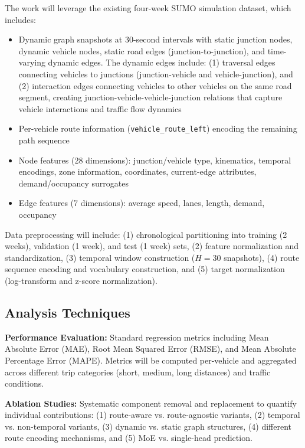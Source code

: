 The work will leverage the existing four-week SUMO simulation dataset, which includes:
\begin{itemize}
    \item Dynamic graph snapshots at 30-second intervals with static junction nodes, dynamic vehicle nodes, static road edges (junction-to-junction), and time-varying dynamic edges. The dynamic edges include: (1) traversal edges connecting vehicles to junctions (junction-vehicle and vehicle-junction), and (2) interaction edges connecting vehicles to other vehicles on the same road segment, creating junction-vehicle-vehicle-junction relations that capture vehicle interactions and traffic flow dynamics
    \item Per-vehicle route information (\texttt{vehicle\_route\_left}) encoding the remaining path sequence
    \item Node features (28 dimensions): junction/vehicle type, kinematics, temporal encodings, zone information, coordinates, current-edge attributes, demand/occupancy surrogates
    \item Edge features (7 dimensions): average speed, lanes, length, demand, occupancy
\end{itemize}

Data preprocessing will include: (1) chronological partitioning into training (2 weeks), validation (1 week), and test (1 week) sets, (2) feature normalization and standardization, (3) temporal window construction ($H=30$ snapshots), (4) route sequence encoding and vocabulary construction, and (5) target normalization (log-transform and z-score normalization).

\subsection{Analysis Techniques}

\textbf{Performance Evaluation:} Standard regression metrics including Mean Absolute Error (MAE), Root Mean Squared Error (RMSE), and Mean Absolute Percentage Error (MAPE). Metrics will be computed per-vehicle and aggregated across different trip categories (short, medium, long distances) and traffic conditions.

\textbf{Ablation Studies:} Systematic component removal and replacement to quantify individual contributions: (1) route-aware vs. route-agnostic variants, (2) temporal vs. non-temporal variants, (3) dynamic vs. static graph structures, (4) different route encoding mechanisms, and (5) MoE vs. single-head prediction.

